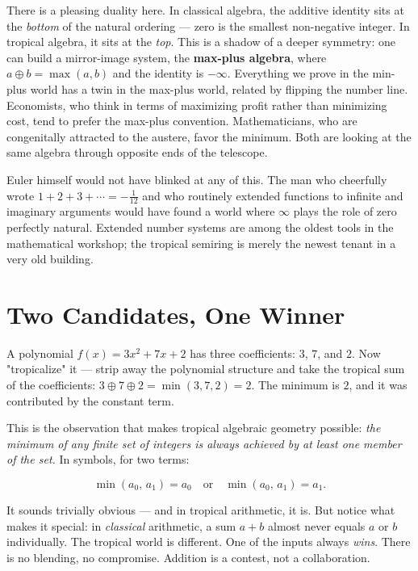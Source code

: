 There is a pleasing duality here. In classical algebra, the additive identity sits at the \textit{bottom} of the natural ordering --- zero is the smallest non-negative integer. In tropical algebra, it sits at the \textit{top}. This is a shadow of a deeper symmetry: one can build a mirror-image system, the \textbf{max-plus algebra}, where $a \oplus b = \max(a,b)$ and the identity is $-\infty$. Everything we prove in the min-plus world has a twin in the max-plus world, related by flipping the number line. Economists, who think in terms of maximizing profit rather than minimizing cost, tend to prefer the max-plus convention. Mathematicians, who are congenitally attracted to the austere, favor the minimum. Both are looking at the same algebra through opposite ends of the telescope.

Euler himself would not have blinked at any of this. The man who cheerfully wrote $1 + 2 + 3 + \cdots = -\tfrac{1}{12}$ and who routinely extended functions to infinite and imaginary arguments would have found a world where $\infty$ plays the role of zero perfectly natural. Extended number systems are among the oldest tools in the mathematical workshop; the tropical semiring is merely the newest tenant in a very old building.

\bigskip

\section*{Two Candidates, One Winner}

A polynomial $f(x) = 3x^2 + 7x + 2$ has three coefficients: $3$, $7$, and $2$. Now "tropicalize" it --- strip away the polynomial structure and take the tropical sum of the coefficients: $3 \oplus 7 \oplus 2 = \min(3, 7, 2) = 2$. The minimum is $2$, and it was contributed by the constant term.

This is the observation that makes tropical algebraic geometry possible: \textit{the minimum of any finite set of integers is always achieved by at least one member of the set.} In symbols, for two terms:

\[
\min(a_0,\, a_1) = a_0 \quad \text{or} \quad \min(a_0,\, a_1) = a_1.
\]

It sounds trivially obvious --- and in tropical arithmetic, it is. But notice what makes it special: in \textit{classical} arithmetic, a sum $a + b$ almost never equals $a$ or $b$ individually. The tropical world is different. One of the inputs always \textit{wins}. There is no blending, no compromise. Addition is a contest, not a collaboration.


